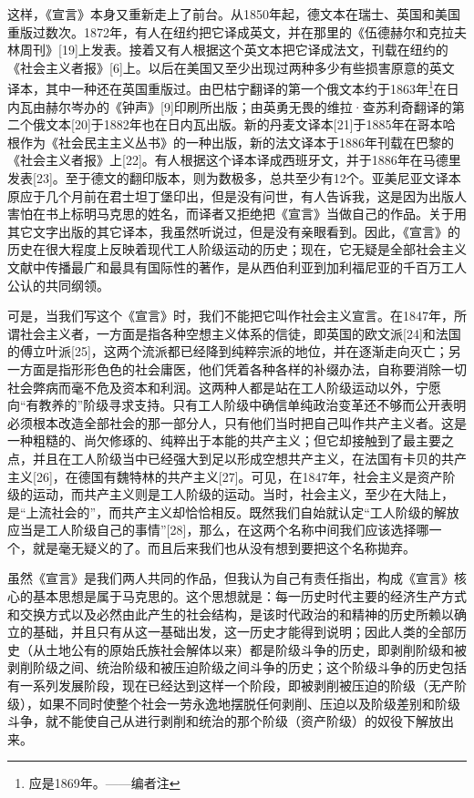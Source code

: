 \documentclass[UTF8,zihao=-4,a4paper]{ctexart}
\begin{document}
这样，《宣言》本身又重新走上了前台。从1850年起，德文本在瑞士、英国和美国重版过数次。1872年，有人在纽约把它译成英文，并在那里的《伍德赫尔和克拉夫林周刊》[19]上发表。接着又有人根据这个英文本把它译成法文，刊载在纽约的《社会主义者报》[6]上。以后在美国又至少出现过两种多少有些损害原意的英文译本，其中一种还在英国重版过。由巴枯宁翻译的第一个俄文本约于1863年\footnote{应是1869年。——编者注}在日内瓦由赫尔岑办的《钟声》[9]印刷所出版；由英勇无畏的维拉·查苏利奇翻译的第二个俄文本[20]于1882年也在日内瓦出版。新的丹麦文译本[21]于1885年在哥本哈根作为《社会民主主义丛书》的一种出版，新的法文译本于1886年刊载在巴黎的《社会主义者报》上[22]。有人根据这个译本译成西班牙文，并于1886年在马德里发表[23]。至于德文的翻印版本，则为数极多，总共至少有12个。亚美尼亚文译本原应于几个月前在君士坦丁堡印出，但是没有问世，有人告诉我，这是因为出版人害怕在书上标明马克思的姓名，而译者又拒绝把《宣言》当做自己的作品。关于用其它文字出版的其它译本，我虽然听说过，但是没有亲眼看到。因此，《宣言》的历史在很大程度上反映着现代工人阶级运动的历史；现在，它无疑是全部社会主义文献中传播最广和最具有国际性的著作，是从西伯利亚到加利福尼亚的千百万工人公认的共同纲领。\par
可是，当我们写这个《宣言》时，我们不能把它叫作社会主义宣言。在1847年，所谓社会主义者，一方面是指各种空想主义体系的信徒，即英国的欧文派[24]和法国的傅立叶派[25]，这两个流派都已经降到纯粹宗派的地位，并在逐渐走向灭亡；另一方面是指形形色色的社会庸医，他们凭着各种各样的补缀办法，自称要消除一切社会弊病而毫不危及资本和利润。这两种人都是站在工人阶级运动以外，宁愿向“有教养的”阶级寻求支持。只有工人阶级中确信单纯政治变革还不够而公开表明必须根本改造全部社会的那一部分人，只有他们当时把自己叫作共产主义者。这是一种粗糙的、尚欠修琢的、纯粹出于本能的共产主义；但它却接触到了最主要之点，并且在工人阶级当中已经强大到足以形成空想共产主义，在法国有卡贝的共产主义[26]，在德国有魏特林的共产主义[27]。可见，在1847年，社会主义是资产阶级的运动，而共产主义则是工人阶级的运动。当时，社会主义，至少在大陆上，是“上流社会的”，而共产主义却恰恰相反。既然我们自始就认定“工人阶级的解放应当是工人阶级自己的事情”[28]，那么，在这两个名称中间我们应该选择哪一个，就是毫无疑义的了。而且后来我们也从没有想到要把这个名称拋弃。\par
虽然《宣言》是我们两人共同的作品，但我认为自己有责任指出，构成《宣言》核心的基本思想是属于马克思的。这个思想就是：每一历史时代主要的经济生产方式和交换方式以及必然由此产生的社会结构，是该时代政治的和精神的历史所赖以确立的基础，并且只有从这一基础出发，这一历史才能得到说明；因此人类的全部历史（从土地公有的原始氏族社会解体以来）都是阶级斗争的历史，即剥削阶级和被剥削阶级之间、统治阶级和被压迫阶级之间斗争的历史；这个阶级斗争的历史包括有一系列发展阶段，现在已经达到这样一个阶段，即被剥削被压迫的阶级（无产阶级），如果不同时使整个社会一劳永逸地摆脱任何剥削、压迫以及阶级差别和阶级斗争，就不能使自己从进行剥削和统治的那个阶级（资产阶级）的奴役下解放出来。\par
\end{document}
